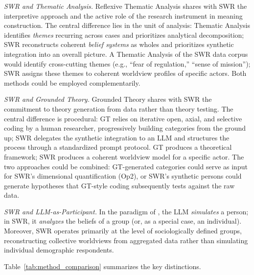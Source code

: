 \documentclass[11pt,a4paper]{article}
\theoremstyle{definition}
\theoremstyle{plain}
\theoremstyle{remark}
\begin{document}
\emph{SWR and Thematic Analysis.} Reflexive Thematic Analysis \citep{BraunClarke2006} shares with SWR the interpretive approach and the active role of the research instrument in meaning construction. The central difference lies in the unit of analysis: Thematic Analysis identifies \emph{themes} recurring across cases and prioritizes analytical decomposition; SWR reconstructs coherent \emph{belief systems} as wholes and prioritizes synthetic integration into an overall picture. A Thematic Analysis of the SWR data corpus would identify cross-cutting themes (e.g., ``fear of regulation,'' ``sense of mission''); SWR assigns these themes to coherent worldview profiles of specific actors. Both methods could be employed complementarily.

\emph{SWR and Grounded Theory.} Grounded Theory \citep{GlaserStrauss1967, Saldana2021} shares with SWR the commitment to theory generation from data rather than theory testing. The central difference is procedural: GT relies on iterative open, axial, and selective coding by a human researcher, progressively building categories from the ground up; SWR delegates the synthetic integration to an LLM and structures the process through a standardized prompt protocol. GT produces a theoretical framework; SWR produces a coherent worldview model for a specific actor. The two approaches could be combined: GT-generated categories could serve as input for SWR's dimensional quantification (Op2), or SWR's synthetic persons could generate hypotheses that GT-style coding subsequently tests against the raw data.

\emph{SWR and LLM-as-Participant.} In the paradigm of \citet{Argyle2023}, the LLM \emph{simulates} a person; in SWR, it \emph{analyzes} the beliefs of a group (or, as a special case, an individual). Moreover, SWR operates primarily at the level of sociologically defined groups, reconstructing collective worldviews from aggregated data rather than simulating individual demographic respondents.

Table~\ref{tab:method_comparison} summarizes the key distinctions.
\end{document}
